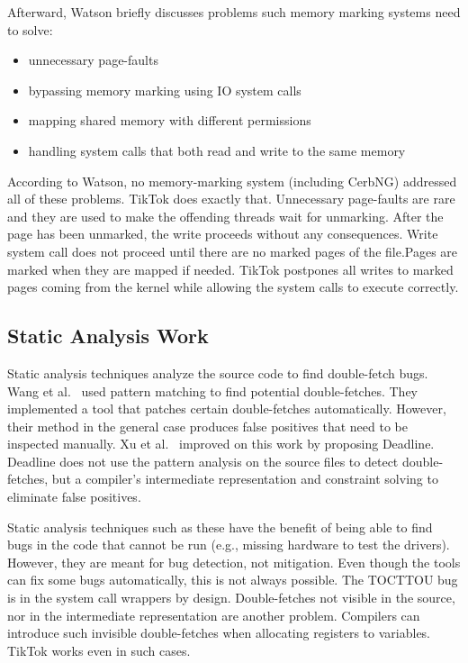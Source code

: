 \documentclass[conference]{IEEEtran}
\newcommand{\sysname}{TikTok}
\begin{document}
Afterward, Watson briefly discusses problems such memory marking systems
need to solve: 
\begin{itemize}
    \item unnecessary page-faults
    \item bypassing memory marking using IO system calls
    \item mapping shared memory with different permissions
    \item handling system calls that both read and write to the same memory
\end{itemize}

According to Watson, no memory-marking system (including CerbNG) addressed all
of these problems. \sysname{} does exactly that. Unnecessary page-faults are
rare and they are used to make the offending threads wait for unmarking. After
the page has been unmarked, the write proceeds without any consequences. Write
system call does not proceed until there are no marked pages of the file.Pages
are marked when they are mapped if needed. \sysname{} postpones all writes to
marked pages coming from the kernel while allowing the system calls to execute
correctly.

\subsection{Static Analysis Work}
\label{subsec:dfstatic}
Static analysis techniques analyze the source code to find double-fetch bugs.
Wang et al.~\cite{wang2017double} used pattern matching to find potential
double-fetches. They implemented a tool that patches certain double-fetches
automatically. However, their method in the general case produces false
positives that need to be inspected manually. Xu et al.~\cite{xu2018precise}
improved on this work by proposing Deadline. Deadline does not use the pattern 
analysis on the source files to detect double-fetches, but a compiler's
intermediate representation and constraint solving to eliminate false positives.

Static analysis techniques such as these have the benefit of being able to find
bugs in the code that cannot be run (e.g., missing hardware to test the
drivers). However, they are meant for bug detection, not mitigation. Even though
the tools can fix some bugs automatically, this is not always possible. The
TOCTTOU bug is in the system call wrappers by design. Double-fetches not visible
in the source, nor in the intermediate representation are another problem.
Compilers can introduce such invisible double-fetches when allocating registers
to variables. \sysname{} works even in such cases.
\end{document}
